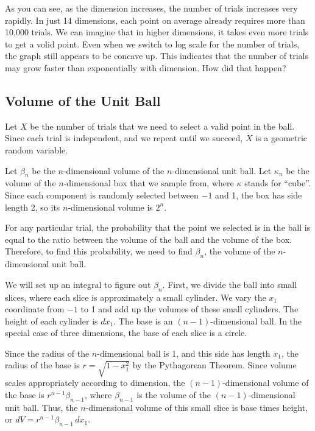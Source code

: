 \documentclass{article}
\begin{document}
As you can see, as the dimension increases, the number of trials increases very rapidly. In just 14 dimensions, each point on average already requires more than 10,000 trials. We can imagine that in higher dimensions, it takes even more trials to get a volid point. Even when we switch to log scale for the number of trials, the graph still appears to be concave up. This indicates that the number of trials may grow faster than exponentially with dimension. How did that happen?

\subsection{Volume of the Unit Ball}

Let $X$ be the number of trials that we need to select a valid point in the ball. Since each trial is independent, and we repeat until we succeed, $X$ is a geometric random variable.

Let $\beta_n$ be the $n$-dimensional volume of the $n$-dimensional unit ball. Let $\kappa_n$ be the volume of the $n$-dimensional box that we sample from, where $\kappa$ stands for ``cube''. Since each component is randomly selected between $-1$ and 1, the box has side length 2, so its $n$-dimensional volume is $2^n$.

For any particular trial, the probability that the point we selected is in the ball is equal to the ratio between the volume of the ball and the volume of the box. Therefore, to find this probability, we need to find $\beta_n$, the volume of the $n$-dimensional unit ball.


We will set up an integral to figure out $\beta_n$. First, we divide the ball into small slices, where each slice is approximately a small cylinder. We vary the $x_1$ coordinate from $-1$ to 1 and add up the volumes of these small cylinders. The height of each cylinder is $dx_1$. The base is an $(n-1)$-dimensional ball. In the special case of three dimensions, the base of each slice is a circle.

Since the radius of the $n$-dimensional ball is 1, and this side has length $x_1$, the radius of the base is $r = \sqrt{1 - x_1^2}$ by the Pythagorean Theorem. Since volume scales appropriately according to dimension, the $(n-1)$-dimensional volume of the base is $r^{n-1} \beta_{n-1}$, where $\beta_{n-1}$ is the volume of the $(n-1)$-dimensional unit ball. Thus, the $n$-dimensional volume of this small slice is base times height, or $dV = r^{n-1} \beta_{n-1} \, dx_1$.
\end{document}
